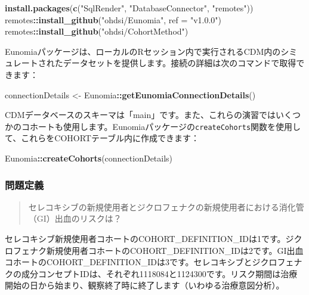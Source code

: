\documentclass[
  11pt]{book}
\newenvironment{Shaded}{\begin{snugshade}}{\end{snugshade}}
\newcommand{\AttributeTok}[1]{\textcolor[rgb]{0.13,0.29,0.53}{#1}}
\newcommand{\FunctionTok}[1]{\textcolor[rgb]{0.13,0.29,0.53}{\textbf{#1}}}
\newcommand{\NormalTok}[1]{#1}
\newcommand{\OtherTok}[1]{\textcolor[rgb]{0.56,0.35,0.01}{#1}}
\newcommand{\SpecialCharTok}[1]{\textcolor[rgb]{0.81,0.36,0.00}{\textbf{#1}}}
\newcommand{\StringTok}[1]{\textcolor[rgb]{0.31,0.60,0.02}{#1}}
\theoremstyle{definition}
\theoremstyle{definition}
\theoremstyle{definition}
\theoremstyle{definition}
\theoremstyle{remark}
\begin{document}
\begin{Shaded}
\begin{Highlighting}[]
\FunctionTok{install.packages}\NormalTok{(}\FunctionTok{c}\NormalTok{(}\StringTok{"SqlRender"}\NormalTok{, }\StringTok{"DatabaseConnector"}\NormalTok{, }\StringTok{"remotes"}\NormalTok{))}
\NormalTok{remotes}\SpecialCharTok{::}\FunctionTok{install\_github}\NormalTok{(}\StringTok{"ohdsi/Eunomia"}\NormalTok{, }\AttributeTok{ref =} \StringTok{"v1.0.0"}\NormalTok{)}
\NormalTok{remotes}\SpecialCharTok{::}\FunctionTok{install\_github}\NormalTok{(}\StringTok{"ohdsi/CohortMethod"}\NormalTok{)}
\end{Highlighting}
\end{Shaded}

Eunomiaパッケージは、ローカルのRセッション内で実行されるCDM内のシミュレートされたデータセットを提供します。接続の詳細は次のコマンドで取得できます：

\begin{Shaded}
\begin{Highlighting}[]
\NormalTok{connectionDetails }\OtherTok{\textless{}{-}}\NormalTok{ Eunomia}\SpecialCharTok{::}\FunctionTok{getEunomiaConnectionDetails}\NormalTok{()}
\end{Highlighting}
\end{Shaded}

CDMデータベースのスキーマは「main」です。また、これらの演習ではいくつかのコホートも使用します。Eunomiaパッケージの\texttt{createCohorts}関数を使用して、これらをCOHORTテーブル内に作成できます：

\begin{Shaded}
\begin{Highlighting}[]
\NormalTok{Eunomia}\SpecialCharTok{::}\FunctionTok{createCohorts}\NormalTok{(connectionDetails)}
\end{Highlighting}
\end{Shaded}

\subsubsection*{問題定義}\label{ux554fux984cux5b9aux7fa9}

\begin{quote}
セレコキシブの新規使用者とジクロフェナクの新規使用者における消化管（GI）出血のリスクは？
\end{quote}

セレコキシブ新規使用者コホートのCOHORT\_DEFINITION\_IDは1です。ジクロフェナク新規使用者コホートのCOHORT\_DEFINITION\_IDは2です。GI出血コホートのCOHORT\_DEFINITION\_IDは3です。セレコキシブとジクロフェナクの成分コンセプトIDは、それぞれ1118084と1124300です。リスク期間は治療開始の日から始まり、観察終了時に終了します（いわゆる治療意図分析）。
\end{document}
